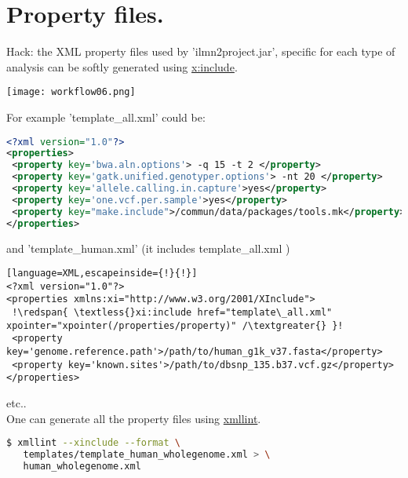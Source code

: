 \documentclass{article}
\newcommand{\redspan}[1]{\textcolor{red}{#1}}
\begin{document}
\section{Property files.}
Hack: the XML property files used by 'ilmn2project.jar', specific for each type of analysis can be softly generated using \href{http://www.w3.org/TR/xinclude/}{x:include}.
\begin{center}
\texttt{[image: workflow06.png]}
\end{center}
For example 'template\_all.xml' could be:
\begin{lstlisting}[language=XML]
<?xml version="1.0"?>
<properties>
 <property key='bwa.aln.options'> -q 15 -t 2 </property>
 <property key='gatk.unified.genotyper.options'> -nt 20 </property>
 <property key='allele.calling.in.capture'>yes</property>
 <property key='one.vcf.per.sample'>yes</property>
 <property key="make.include">/commun/data/packages/tools.mk</property>
</properties>
\end{lstlisting}
and 'template\_human.xml' (it includes template\_all.xml )
\begin{lstlisting}[language=XML,escapeinside={!}{!}]
<?xml version="1.0"?>
<properties xmlns:xi="http://www.w3.org/2001/XInclude">
 !\redspan{ \textless{}xi:include href="template\_all.xml" xpointer="xpointer(/properties/property)" /\textgreater{} }!
 <property key='genome.reference.path'>/path/to/human_g1k_v37.fasta</property>
 <property key='known.sites'>/path/to/dbsnp_135.b37.vcf.gz</property>
</properties>
\end{lstlisting}
etc..\\
One can generate all the property files using \href{http://xmlsoft.org/xmllint.html}{xmllint}.
\begin{lstlisting}[language=bash]
$ xmllint --xinclude --format \
   templates/template_human_wholegenome.xml > \
   human_wholegenome.xml
\end{lstlisting} 
\end{document}
